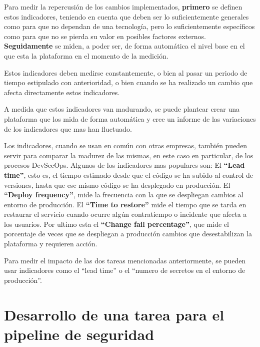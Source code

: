 \documentclass[12pt]{report} %
\begin{document}
Para medir la repercusión de los cambios implementados, \textbf{primero} se definen estos
indicadores, teniendo en cuenta que deben ser lo suficientemente generales como
para que no dependan de una tecnología, pero lo suficientemente específicos
como para que no se pierda su valor en posibles factores externos.
\textbf{Seguidamente} se miden, a poder ser, de forma automática el nivel base en el
que esta la plataforma en el momento de la medición.

Estos indicadores deben medirse constantemente, o bien al pasar un periodo de
tiempo estipulado con anterioridad, o bien cuando se ha realizado un cambio que
afecta directamente estos indicadores.

A medida que estos indicadores van madurando, se puede plantear crear una
plataforma que los mida de forma automática y cree un informe de las variaciones
de los indicadores que mas han fluctuado.

Los indicadores, cuando se usan en común con otras empresas, también pueden
servir para comparar la madurez de las mismas, en este caso en particular, de
los procesos \gls{DevSecOps}.
Algunos de los indicadores mas populares son:
El \textbf{``Lead time''}, esto es, el tiempo estimado desde que el código se ha subido
al control de versiones, hasta que ese mismo código se ha desplegado en
producción.
El \textbf{``Deploy frequency''}, mide la frecuencia con la que se despliegan
cambios al entorno de producción.
El \textbf{``Time to restore''} mide el tiempo que se tarda en restaurar el
servicio cuando ocurre algún contratiempo o incidente que afecta a los usuarios.
Por ultimo esta el \textbf{``Change fail percentage''}, que mide el porcentaje
de veces que se despliegan a producción cambios que desestabilizan la plataforma
y requieren acción.

Para medir el impacto de las dos tareas mencionadas anteriormente, se pueden
usar indicadores como el ``lead time'' o el ``numero de secretos en el entorno de
producción''.


\chapter{Desarrollo de una tarea para el pipeline de seguridad}
\end{document}
